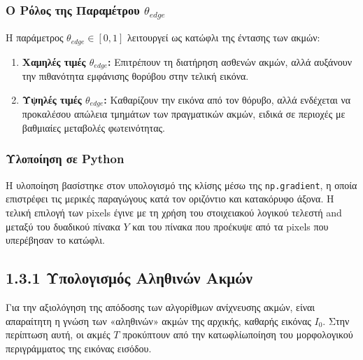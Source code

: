 \documentclass[12pt,a4paper]{article}
\begin{document}
\subsubsection*{Ο Ρόλος της Παραμέτρου $\theta_{edge}$}
Η παράμετρος $\theta_{edge} \in [0, 1]$ λειτουργεί ως κατώφλι της έντασης των ακμών:
\begin{enumerate}
    \item \textbf{Χαμηλές τιμές $\theta_{edge}$:} Επιτρέπουν τη διατήρηση ασθενών ακμών, αλλά αυξάνουν την πιθανότητα εμφάνισης θορύβου στην τελική εικόνα.
    \item \textbf{Υψηλές τιμές $\theta_{edge}$:} Καθαρίζουν την εικόνα από τον θόρυβο, αλλά ενδέχεται να προκαλέσου απώλεια τμημάτων των πραγματικών ακμών, ειδικά σε περιοχές με βαθμιαίες μεταβολές φωτεινότητας.
\end{enumerate}



\subsubsection*{Υλοποίηση σε \foreignlanguage{english}{Python}}
\hspace{0.6cm}Η υλοποίηση βασίστηκε στον υπολογισμό της κλίσης μέσω της \texttt{\foreignlanguage{english}{np.gradient}}, η οποία επιστρέφει τις μερικές παραγώγους κατά τον οριζόντιο και κατακόρυφο άξονα. Η τελική επιλογή των \foreignlanguage{english}{pixels} έγινε με τη χρήση του στοιχειακού λογικού τελεστή \foreignlanguage{english}{and} μεταξύ του δυαδικού πίνακα $Y$ και του πίνακα που προέκυψε από τα  \foreignlanguage{english}{pixels} που υπερέβησαν το κατώφλι.

\subsection*{1.3.1 Υπολογισμός Αληθινών Ακμών}

\hspace{0.6cm}Για την αξιολόγηση της απόδοσης των αλγορίθμων ανίχνευσης ακμών, είναι απαραίτητη η γνώση των «αληθινών» ακμών της αρχικής, καθαρής εικόνας $I_0$. Στην περίπτωση αυτή, οι ακμές $T$ προκύπτουν από την κατωφλίωποίηση του μορφολογικού περιγράμματος της εικόνας εισόδου.
\end{document}
